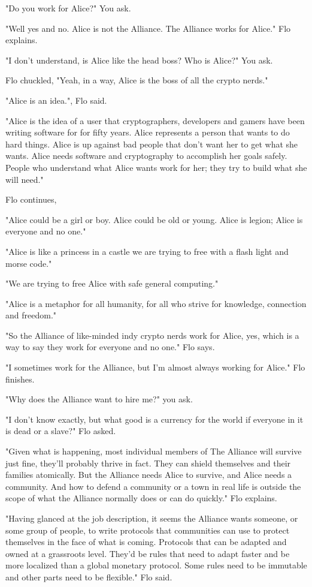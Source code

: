 \documentclass[a5paper, symmetric]{tufte-book}
\begin{document}
"Do you work for Alice?" You ask. 

"Well yes and no. Alice is not the Alliance. The Alliance works for Alice." Flo explains. 

"I don't understand, is Alice like the head boss? Who is Alice?" You ask. 

Flo chuckled, "Yeah, in a way, Alice is the boss of all the crypto nerds."

"Alice is an idea.", Flo said. 

"Alice is the idea of a user that cryptographers, developers and gamers have been writing software for for fifty years. Alice represents a person that wants to do hard things. Alice is up against bad people that don't want her to get what she wants. Alice needs software and cryptography to accomplish her goals safely. People who understand what Alice wants work for her; they try to build what she will need." 

Flo continues,

"Alice could be a girl or boy. Alice could be old or young. Alice is legion; Alice is everyone and no one." 

"Alice is like a princess in a castle we are trying to free with a flash light and morse code." 

"We are trying to free Alice with safe general computing."

"Alice is a metaphor for all humanity, for all who strive for knowledge, connection and freedom." 

"So the Alliance of like-minded indy crypto nerds work for Alice, yes, which is a way to say they work for everyone and no one." Flo says. 

"I sometimes work for the Alliance, but I'm almost always working for Alice." Flo finishes.

"Why does the Alliance want to hire me?" you ask. 

"I don't know exactly, but what good is a currency for the world if everyone in it is dead or a slave?" Flo asked. 

"Given what is happening, most individual members of The Alliance will survive just fine, they'll probably thrive in fact. They can shield themselves and their families atomically. But the Alliance needs Alice to survive, and Alice needs a community.  And how to defend a community or a town in real life is outside the scope of what the Alliance normally does or can do quickly." Flo explains. 

"Having glanced at the job description, it seems the Alliance wants someone, or some group of people, to write protocols that communities can use to protect themselves in the face of what is coming. Protocols that can be adapted and owned at a grassroots level. They'd be rules that need to adapt faster and be more localized than a global monetary protocol. Some rules need to be immutable and other parts need to be flexible." Flo said.
\end{document}
